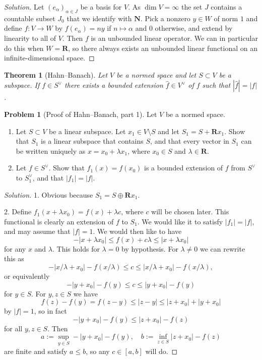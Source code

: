 \documentclass[11pt]{article}
\newtheorem*{theo}{Theorem}
\theoremstyle{definition}
\newtheorem{prob}{Problem}
\newcommand{\kk}[1]{\mathbf{#1}}
\begin{document}
\begin{proof}[Solution]
Let $(e_\alpha)_{\alpha \in J}$ be a basis for $V$.
As $\dim V = \infty$ the set $J$ contains a countable subset $J_0$ that
we identify with $\kk N$.
Pick a nonzero $y \in W$ of norm $1$ and define $f : V \to W$ by
\(
f(e_\alpha) = n y
\)
if $n \mapsto \alpha$ and $0$ otherwise, and extend by linearity to all of $V$.
Then $f$ is an unbounded linear operator.
We can in particular do this when $W = \kk R$, so there always exists an
unbounded linear functional on an infinite-dimensional space.
\end{proof}


\begin{theo}[Hahn--Banach]
Let $V$ be a normed space and let $S \subset V$ be a subspace.
If $f \in S^\vee$ there exists a bounded extension $\hat f \in V^\vee$ of $f$
such that $|\hat f| = |f|$.
\end{theo}

\begin{prob}[Proof of Hahn--Banach, part 1]
Let $V$ be a normed space.
\begin{enumerate}
\item
Let $S \subset V$ be a linear subspace.
Let $x_1 \in V \setminus S$ and let $S_1 = S + \kk R x_1$.
Show that $S_1$ is a linear subspace that contains $S$, and that every vector
in $S_1$ can be written uniquely as $x = x_0 + \lambda x_1$, where $x_0 \in S$
and $\lambda \in \kk R$.

\item
Let $f \in S^\vee$.
Show that $f_1(x) = f(x_0)$ is a bounded extension of $f$ from $S^\vee$ to
$S_1^\vee$, and that $|f_1| = |f|$.
\end{enumerate}
\end{prob}

\begin{proof}[Solution]
1. Obvious because $S_1 = S \oplus \kk R x_1$.

2. Define $f_1(x + \lambda x_0) = f(x) + \lambda c$, where $c$ will be chosen
later. This functional is clearly an extension of $f$ to $S_1$.
We would like it to satisfy $|f_1| = |f|$, and may assume that $|f| = 1$.
We would then like to have
\[
- |x + \lambda x_0| \leq f(x) + c \lambda \leq |x + \lambda x_0|
\]
for any $x$ and $\lambda$.
This holds for $\lambda = 0$ by hypothesis.
For $\lambda \not= 0$ we can rewrite this as
\[
- |x/\lambda + x_0| - f(x / \lambda)
\leq c
\leq |x/\lambda + x_0| - f(x / \lambda),
\]
or equivalently
\[
- |y + x_0| - f(y)
\leq c
\leq |y + x_0| - f(y)
\]
for $y \in S$.
For $y, z \in S$ we have
\[
f(z) - f(y)
= f(z-y)
\leq |z - y|
\leq |z + x_0| + |y + x_0|
\]
by $|f| = 1$, so in fact
\[
- |y + x_0| - f(y)
\leq |z + x_0| - f(z)
\]
for all $y, z \in S$.
Then
\[
a := \sup_{y \in S} -|y + x_0| - f(y),
\quad
b := \inf_{z \in S} |z + x_0| - f(z)
\]
are finite and satisfy $a \leq b$, so any $c \in [a, b]$ will do.
\end{proof}
\end{document}
